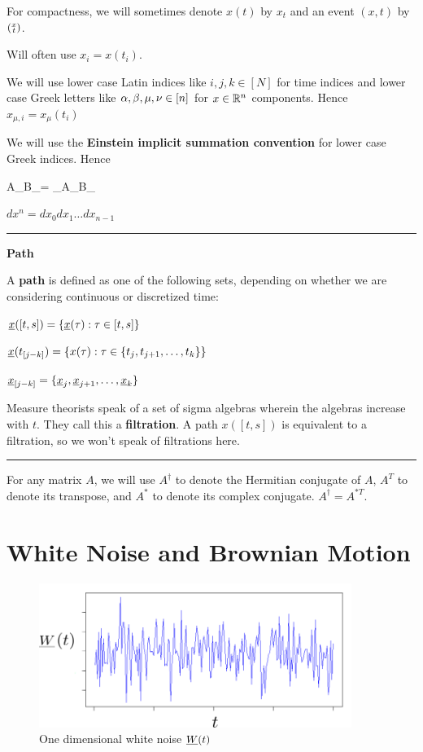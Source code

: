 For compactness, we will sometimes denote $x(t)$ by $x_t$ and an event $(x,t)$ by  $(\substack{x\\t})$. 

Will often use $x_i=x(t_i)$.

We will use lower case Latin indices like $i,j,k\in [N]$ for time indices
and lower case Greek letters like $\alpha, \beta, \mu, \nu\in[n]$  for $x\in{ \mathbb{R}}^n$ components.
Hence $x_{\mu, i}=x_\mu(t_i)$

We will use the {\bf Einstein implicit summation
convention} for lower case Greek indices.
Hence

\beq
A_\mu B_\mu = \sum_{\mu \in[n]}A_\mu B_\mu
\eeq


$dx^n = dx_0 dx_1 \ldots dx_{n-1}$
\hrule\noindent
{\bf Path}

A {\bf path} is defined as one of the following sets, depending on whether we are considering continuous or discretized time:

${\underline{x}}([t,s])=\{  {\underline{x}}(\tau): \tau\in[t,s]\}$


${\underline{x}}(t_{[j- k]}) =\{  x(\tau): \tau\in\{t_j, t_{j+1}, \ldots, t_k\}\}$

${\underline{x}}_{[j- k]} =\{ {\underline{x}}_j, {\underline{x}}_{j+1},
\ldots,{\underline{x}}_k\}$

Measure theorists speak of a set of sigma algebras wherein the algebras increase with $t$. They call this a {\bf filtration}. A path $x([t, s])$ is equivalent to a filtration,
so we won't speak of filtrations here.
\hrule
For any matrix $A$,
we will use $A^\dagger$ to denote the Hermitian conjugate of $A$, $A^T$ to denote its transpose, and $A^*$ to denote its complex conjugate. $A^\dagger = A^{* T}$.

 
 \section{White Noise and Brownian Motion}
 
 \begin{figure}[h!]
 \centering
 \includegraphics[width=4in]
 {stochastic-diff-eqns/white-noise-labeled}
 \caption{One dimensional white noise ${\underline{W}}(t)$}
 \label{fig-white-noise-t}
 \end{figure}
 
